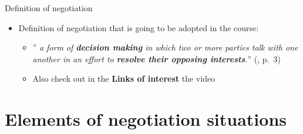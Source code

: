 \documentclass[
  ignorenonframetext,
]{beamer}
\providecommand{\tightlist}{%
  \setlength{\itemsep}{0pt}\setlength{\parskip}{0pt}}\usepackage{longtable,booktabs,array}
\begin{document}
\begin{frame}{Definition of negotiation}
\begin{itemize}
\item
  Definition of negotiation that is going to be adopted in the course:

  \begin{itemize}
  \item
    '' \emph{a form of \textbf{decision making} in which two or more
    parties talk with one another in an effort to \textbf{resolve their
    opposing interests}.}''
    (, p.~3)
  \item
    Also check out in the \textbf{Links of interest} the video

  \end{itemize}
\end{itemize}
\end{frame}

\section{Elements of negotiation
situations}\label{elements-of-negotiation-situations}
\end{document}
